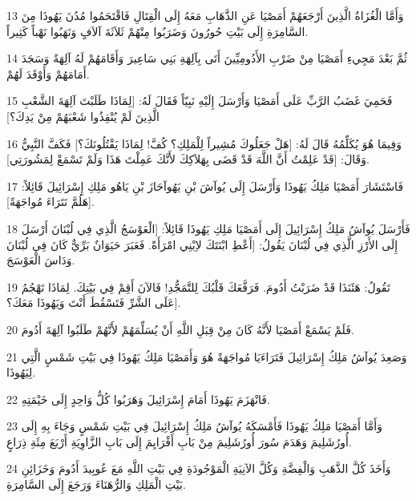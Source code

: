 \par 13 وَأَمَّا الْغُزَاةُ الَّذِينَ أَرْجَعَهُمْ أَمَصْيَا عَنِ الذَّهَابِ مَعَهُ إِلَى الْقِتَالِ فَاقْتَحَمُوا مُدُنَ يَهُوذَا مِنَ السَّامِرَةِ إِلَى بَيْتِ حُورُونَ وَضَرَبُوا مِنْهُمْ ثَلاَثَةَ آلاَفٍ وَنَهَبُوا نَهْباً كَثِيراً.
\par 14 ثُمَّ بَعْدَ مَجِيءِ أَمَصْيَا مِنْ ضَرْبِ الأَدُومِيِّينَ أَتَى بِآلِهَةِ بَنِي سَاعِيرَ وَأَقَامَهُمْ لَهُ آلِهَةً وَسَجَدَ أَمَامَهُمْ وَأَوْقَدَ لَهُمْ.
\par 15 فَحَمِيَ غَضَبُ الرَّبِّ عَلَى أَمَصْيَا وَأَرْسَلَ إِلَيْهِ نَبِيّاً فَقَالَ لَهُ: [لِمَاذَا طَلَبْتَ آلِهَةَ الشَّعْبِ الَّذِينَ لَمْ يُنْقِذُوا شَعْبَهُمْ مِنْ يَدِكَ؟]
\par 16 وَفِيمَا هُوَ يُكَلِّمُهُ قَالَ لَهُ: [هَلْ جَعَلُوكَ مُشِيراً لِلْمَلِكِ؟ كُفَّ! لِمَاذَا يَقْتُلُونَكَ؟] فَكَفَّ النَّبِيُّ وَقَالَ: [قَدْ عَلِمْتُ أَنَّ اللَّهَ قَدْ قَضَى بِهَلاَكِكَ لأَنَّكَ عَمِلْتَ هَذَا وَلَمْ تَسْمَعْ لِمَشُورَتِي].
\par 17 فَاسْتَشَارَ أَمَصْيَا مَلِكُ يَهُوذَا وَأَرْسَلَ إِلَى يُوآشَ بْنِ يَهُوآحَازَ بْنِ يَاهُو مَلِكِ إِسْرَائِيلَ قَائِلاً: [هَلُمَّ نَتَرَاءَ مُواجَهَةً].
\par 18 فَأَرْسَلَ يُوآشُ مَلِكُ إِسْرَائِيلَ إِلَى أَمَصْيَا مَلِكِ يَهُوذَا قَائِلاً: [الْعَوْسَجُ الَّذِي فِي لُبْنَانَ أَرْسَلَ إِلَى الأَرْزِ الَّذِي فِي لُبْنَانَ يَقُولُ: [أَعْطِ ابْنَتَكَ لاِبْنِي امْرَأَةً. فَعَبَرَ حَيَوَانٌ بَرِّيٌّ كَانَ فِي لُبْنَانَ وَدَاسَ الْعَوْسَجَ.
\par 19 تَقُولُ: هَئَنَذَا قَدْ ضَرَبْتُ أَدُومَ. فَرَفَّعَكَ قَلْبُكَ لِلتَّمَجُّدِ! فَالآنَ أَقِمْ فِي بَيْتِكَ. لِمَاذَا تَهْجُمُ عَلَى الشَّرِّ فَتَسْقُطَ أَنْتَ وَيَهُوذَا مَعَكَ؟].
\par 20 فَلَمْ يَسْمَعْ أَمَصْيَا لأَنَّهُ كَانَ مِنْ قِبَلِ اللَّهِ أَنْ يُسَلِّمَهُمْ لأَنَّهُمْ طَلَبُوا آلِهَةَ أَدُومَ.
\par 21 وَصَعِدَ يُوآشُ مَلِكُ إِسْرَائِيلَ فَتَرَاءَيَا مُواجَهَةً هُوَ وَأَمَصْيَا مَلِكُ يَهُوذَا فِي بَيْتِ شَمْسٍ الَّتِي لِيَهُوذَا.
\par 22 فَانْهَزَمَ يَهُوذَا أَمَامَ إِسْرَائِيلَ وَهَرَبُوا كُلُّ وَاحِدٍ إِلَى خَيْمَتِهِ.
\par 23 وَأَمَّا أَمَصْيَا مَلِكُ يَهُوذَا فَأَمْسَكَهُ يُوآشُ مَلِكُ إِسْرَائِيلَ فِي بَيْتِ شَمْسٍ وَجَاءَ بِهِ إِلَى أُورُشَلِيمَ وَهَدَمَ سُورَ أُورُشَلِيمَ مِنْ بَابِ أَفْرَايِمَ إِلَى بَابِ الزَّاوِيَةِ أَرْبَعَ مِئَةِ ذِرَاعٍ.
\par 24 وَأَخَذَ كُلَّ الذَّهَبِ وَالْفِضَّةِ وَكُلَّ الآنِيَةِ الْمَوْجُودَةِ فِي بَيْتِ اللَّهِ مَعَ عُوبِيدَ أَدُومَ وَخَزَائِنِ بَيْتِ الْمَلِكِ وَالرُّهَنَاءَ وَرَجَعَ إِلَى السَّامِرَةِ.
